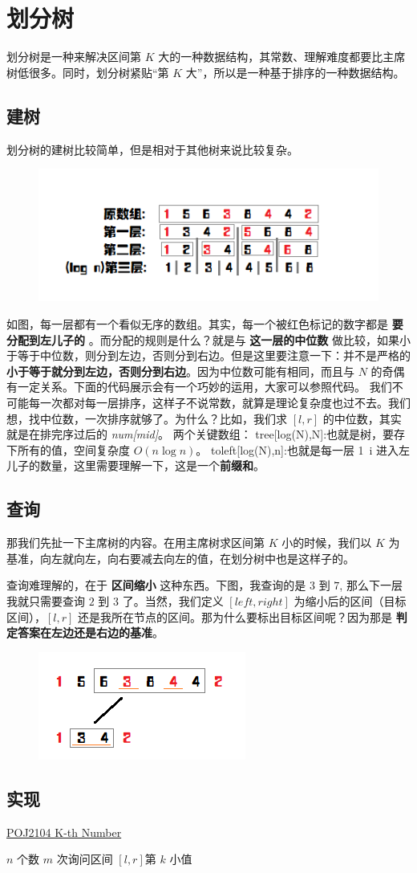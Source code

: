 \section{划分树}
划分树是一种来解决区间第 $K$ 大的一种数据结构，其常数、理解难度都要比主席树低很多。同时，划分树紧贴“第 $K$ 大”，所以是一种基于排序的一种数据结构。
\subsection{建树}
划分树的建树比较简单，但是相对于其他树来说比较复杂。
\begin{figure}[htbp]
	\centering
	\includegraphics{./image/dividing1.png}
\end{figure}
如图，每一层都有一个看似无序的数组。其实，每一个被红色标记的数字都是 \textbf{要分配到左儿子的} 。而分配的规则是什么？就是与 \textbf{这一层的中位数} 做比较，如果小于等于中位数，则分到左边，否则分到右边。但是这里要注意一下：并不是严格的 \textbf{小于等于就分到左边，否则分到右边}。因为中位数可能有相同，而且与 $N$ 的奇偶有一定关系。下面的代码展示会有一个巧妙的运用，大家可以参照代码。
我们不可能每一次都对每一层排序，这样子不说常数，就算是理论复杂度也过不去。我们想，找中位数，一次排序就够了。为什么？比如，我们求 $[l,r]$ 的中位数，其实就是在排完序过后的 \textit{num[mid]}。
两个关键数组：
tree[log(N),N]:也就是树，要存下所有的值，空间复杂度 $O(n\log n)$。 toleft[log(N),n]:也就是每一层 1~i 进入左儿子的数量，这里需要理解一下，这是一个\textbf{前缀和}。

\subsection{查询}
那我们先扯一下主席树的内容。在用主席树求区间第 $K$ 小的时候，我们以 $K$ 为基准，向左就向左，向右要减去向左的值，在划分树中也是这样子的。

查询难理解的，在于 \textbf{区间缩小} 这种东西。下图，我查询的是 $3$ 到 $7$, 那么下一层我就只需要查询 $2$ 到 $3$ 了。当然，我们定义 $[left, right]$ 为缩小后的区间（目标区间），$[l,r]$ 还是我所在节点的区间。那为什么要标出目标区间呢？因为那是 \textbf{判定答案在左边还是右边的基准}。
\begin{figure}[htbp]
	\centering
	\includegraphics{./image/dividing2.png}
\end{figure}

\subsection{实现}
	\href{http://poj.org/problem?id=2104}{POJ2104 K-th Number} \par 
	$n$ 个数 $m$ 次询问区间 $[l,r]$​ 第 $k$ 小值
	
	